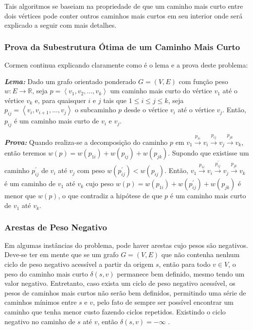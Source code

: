 \documentclass[12pt]{article}
\begin{document}
Tais algoritmos se baseiam na propriedade de que um caminho mais curto entre dois vértices pode conter outros caminhos mais curtos em seu interior onde será explicado a seguir com mais detalhes.



\subsubsection{Prova da Subestrutura Ótima de um Caminho Mais Curto}

Cormen \cite{cormen2002algoritmos} continua explicando claramente como é o lema e a prova deste problema:

\textit{\textbf{Lema:}} Dado um grafo orientado ponderado $G = (V, E)$ com função peso $w : E \rightarrow \mathbb{R}$, seja $p = \left \langle v_{1}, v_{2}, \ldots, v_{k}\right \rangle$ um caminho mais curto do vértice $v_1$ até o vértice $v_k$ e, para quaisquer $i$ e $j$ tais que $1 \le i \le j \le k$, seja $p_{ij}= \left \langle v_{i}, v_{i + 1}, \ldots, v_{j}\right \rangle$ o subcaminho $p$ desde o vértice $v_i$ até o vértice $v_j$. Então, $p_{ij}$ é um caminho mais curto de $v_i$ e $v_j$.

\textit{\textbf{Prova:}} Quando realiza-se a decomposição do caminho $p$ em $v_1 \xrightarrow{p_{1i}} v_i \xrightarrow{p_{ij}} v_j \xrightarrow{p_{jk}} v_k$, então teremos $w(p) = w(p_{1i}) + w(p_{ij}) + w(p_{jk})$. Supondo que existisse um caminho $p^\prime_{ij}$ de $v_i$ até $v_j$ com peso $w(p^\prime_{ij}) < w(p_{ij})$. Então, $v_1 \xrightarrow{p_{1i}} v_i \xrightarrow{p^\prime_{ij}} v_j \xrightarrow{p_{jk}} v_k$ é um caminho de $v_1$ até $v_k$ cujo peso $w(p) = w(p_{1i}) + w(p^\prime_{ij}) + w(p_{jk})$ é menor que $w(p)$, o que contradiz a hipótese de que $p$ é um caminho mais curto de $v_1$ até $v_k$.



\subsubsection{Arestas de Peso Negativo}

Em algumas instâncias do problema, pode haver arestas cujo pesos são negativos. Deve-se ter em mente que se um grafo $G = (V,E)$ que não contenha nenhum ciclo de peso negativo acessível a partir da origem $s$, então para todo $v \in V$, o peso do caminho mais curto $\delta(s,v)$ permanece bem definido, mesmo tendo um valor negativo. Entretanto, caso exista um ciclo de peso negativo acessível, os pesos de caminhos mais curtos não serão bem definidos, permitindo uma série de caminhos mínimos entre $s$ e $v$, pelo fato de sempre ser possível encontrar um caminho que tenha menor custo fazendo ciclos repetidos. Existindo o ciclo negativo no caminho de $s$ até $v$, então $\delta(s,v) = - \infty$ \cite{cormen2002algoritmos}.
\end{document}
